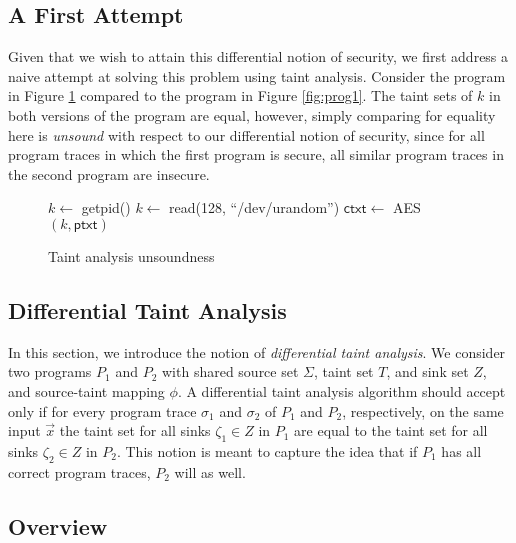 \documentclass[letterpaper,twocolumn,10pt]{article}
\begin{document}
\subsection{A First Attempt}

Given that we wish to attain this differential notion of security, we first address a naive attempt at solving this problem using taint analysis.
Consider the program in Figure \ref{fig:prog2} compared to the program in Figure \ref{fig:prog1}. The taint sets of $k$ in both versions of the program
are equal, however, simply comparing for equality here is \emph{unsound} with respect to our differential notion of security, since for all program traces
in which the first program is secure, all similar program traces in the second program are insecure.

\begin{figure}
    \caption{Taint analysis unsoundness}
    \label{fig:prog2}
    \begin{center}
    \begin{algorithmic}
        \State $k \gets$ \textsf{getpid()}
        \Else
        \State $k \gets$ \textsf{read(128, ``/dev/urandom'')}
        \EndIf
        \State $\mathsf{ctxt} \gets $ \textsf{AES}$(k,\mathsf{ptxt})$
    \end{algorithmic}
\end{center}
\end{figure}

\subsection{Differential Taint Analysis}

In this section, we introduce the notion of \emph{differential taint analysis}.
We consider two programs $P_1$ and $P_2$ with shared
source set $\Sigma$, taint set $T$, and sink set $Z$, and source-taint mapping $\phi$. 
A differential taint analysis algorithm
should accept only if for every program trace $\sigma_1$ and $\sigma_2$ of $P_1$
and $P_2$, respectively, on the same input $\vec{x}$ the taint set for all sinks
$\zeta_1 \in Z$ in $P_1$ are equal to the taint set for all sinks $\zeta_2 \in Z$ in $P_2$.
This notion is meant to capture the idea that if $P_1$ has all correct program traces,
$P_2$ will as well.

\subsection{Overview}
\end{document}
